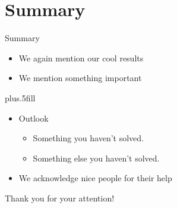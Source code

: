 \section*{Summary}
  \begin{frame}{Summary}
    \begin{itemize}
    \item[\cmark] We again mention our cool results
    \item We mention something important
    \end{itemize}
    
    \vskip0pt plus.5fill
    \begin{itemize}
    \item
      Outlook
      \begin{itemize}
      \item[\xmark]
        Something you haven't solved.
      \item
        Something else you haven't solved.
      \end{itemize}
    \item[\ding{43}] We acknowledge nice people for their help
    \end{itemize}
  \end{frame}



  \begin{frame}
    \begin{center}
      \begin{minipage}{0.7\textwidth}
        \begin{block}{}
          \centering
          \vspace{3mm}
          \Large \alert{Thank you for your attention!}
          \vspace{3mm}
        \end{block}
      \end{minipage}
    \end{center}
  \end{frame}

      






































